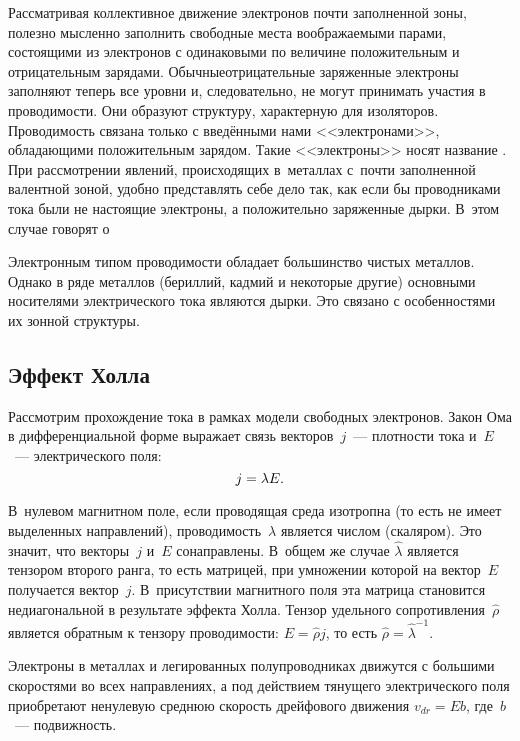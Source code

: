 Рассматривая коллективное движение электронов почти заполненной зоны, полезно
мысленно заполнить свободные места
воображаемыми парами, состоящими из электронов с одинаковыми по величине
положительным и отрицательным зарядами. Обычныеотрицательные заряженные
электроны заполняют теперь все уровни и, следовательно, не могут принимать
участия в проводимости. Они образуют структуру, характерную для изоляторов.
Проводимость связана только с введёнными нами
<<электронами>>, обладающими положительным зарядом. Такие <<электроны>> носят
название . При рассмотрении явлений, происходящих в~металлах
с~почти заполненной валентной зоной, удобно представлять себе дело так, как если
бы проводниками тока были не настоящие электроны, а положительно заряженные
дырки. В~этом случае говорят о 

Электронным типом проводимости обладает большинство чистых металлов. Однако в
ряде металлов (бериллий, кадмий и
некоторые другие) основными носителями электрического тока являются дырки. Это
связано с особенностями их зонной
структуры.

\subsection{Эффект Холла}

Рассмотрим прохождение тока в рамках модели свободных электронов.
Закон Ома в дифференциальной форме выражает связь векторов~$j$~--- плотности тока
и~$E$~--- электрического поля:
\begin{equation}
	j=\lambda E.
	\eqmark{3.16}
\end{equation}

В~нулевом магнитном поле, если проводящая среда изотропна (то есть не имеет
выделенных направлений), проводимость~$\lambda$ является числом (скаляром). Это
значит, что векторы~$j$ и~$E$ сонаправлены. В~общем же случае
$\widehat{\lambda}$ является тензором второго ранга, то есть матрицей, при
умножении которой на вектор~$E$ получается вектор~$j$. В~присутствии магнитного
поля эта матрица становится недиагональной в результате эффекта Холла. Тензор
удельного сопротивления~$\widehat{\rho}$ является обратным к тензору
проводимости: $E=\widehat{\rho}j$, то есть
$\widehat{\rho}=\widehat{\lambda}^{-1}$.

Электроны в металлах и легированных полупроводниках движутся с большими
скоростями во всех направлениях, а под действием тянущего
электрического поля приобретают ненулевую среднюю скорость дрейфового движения
$v_{dr}=  Eb$, где~$b$~--- подвижность.

